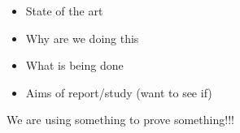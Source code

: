 \begin{itemize}
	\item State of the art
	\item Why are we doing this
	\item What is being done
	\item Aims of report/study (want to see if)
\end{itemize}


We are using something to prove something!!!